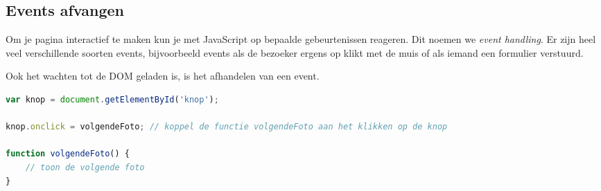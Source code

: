 \documentclass[8pt,pagesize,footinclude=false,headinclude=false]{scrartcl}
\begin{document}
\begin{multicols*}{3}
\subsection*{Events afvangen}
Om je pagina interactief te maken kun je met JavaScript op bepaalde gebeurtenissen reageren. Dit noemen we \emph{event handling}. Er zijn heel veel verschillende soorten events, bijvoorbeeld events als de bezoeker ergens op klikt met de muis of als iemand een formulier verstuurd.

Ook het wachten tot de DOM geladen is, is het afhandelen van een event.

\begin{lstlisting}[language=javascript]
var knop = document.getElementById('knop');

knop.onclick = volgendeFoto; // koppel de functie volgendeFoto aan het klikken op de knop

function volgendeFoto() {
	// toon de volgende foto
}
\end{lstlisting}

\end{multicols*}
\end{document}
